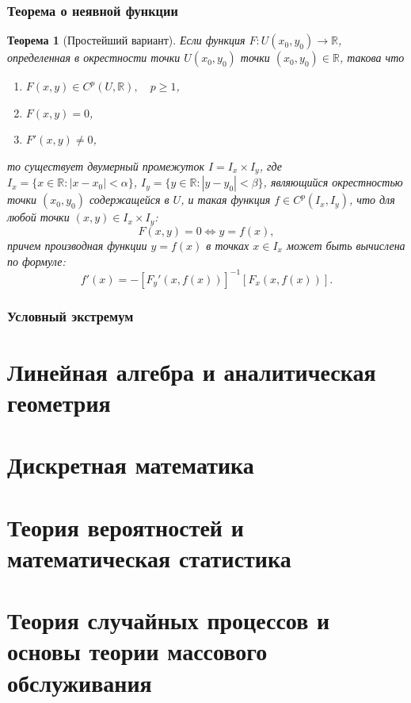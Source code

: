 \documentclass[12pt]{report}
\theoremstyle{plain}
\newtheorem{theorem}{Теорема}[chapter]
\newcommand{\R}{\mathbb R}
\begin{document}
\subsection{Теорема о неявной функции}
\begin{theorem}[Простейший вариант]
Если функция $F: U(x_0, y_0) \rightarrow \R$, определенная в окрестности
точки $U(x_0, y_0)$ точки $(x_0, y_0) \in \R$, такова что
\begin{enumerate}
\item $F(x, y) \in C^p(U, \R),\quad p \ge 1$,
\item $F(x, y) = 0$,
\item $F'(x, y) \ne 0$,
\end{enumerate}
то существует двумерный промежуток $I = I_x \times I_y$, где
$I_x = \{x \in \R: |x - x_0| < \alpha\}$, $I_y = \{y \in \R: |y - y_0| < \beta\}$,
являющийся окрестностью точки $(x_0, y_0)$ содержащейся в $U$, и такая функция
$f \in C^p(I_x, I_y)$, что для любой точки $(x, y) \in I_x \times I_y$:
$$
F(x, y) = 0 \Leftrightarrow y = f(x),
$$
причем производная функции $y=f(x)$ в точках $x \in I_x$ может быть вычислена по формуле:
$$
f'(x) = -[F_y'(x, f(x))]^{-1} [F_x(x, f(x))].
$$
\end{theorem}

\subsection{Условный экстремум}



\chapter{Линейная алгебра и аналитическая геометрия}

\chapter{Дискретная математика}

\chapter{Теория вероятностей и математическая статистика}

\chapter{Теория случайных процессов и основы теории массового обслуживания}
\end{document}
